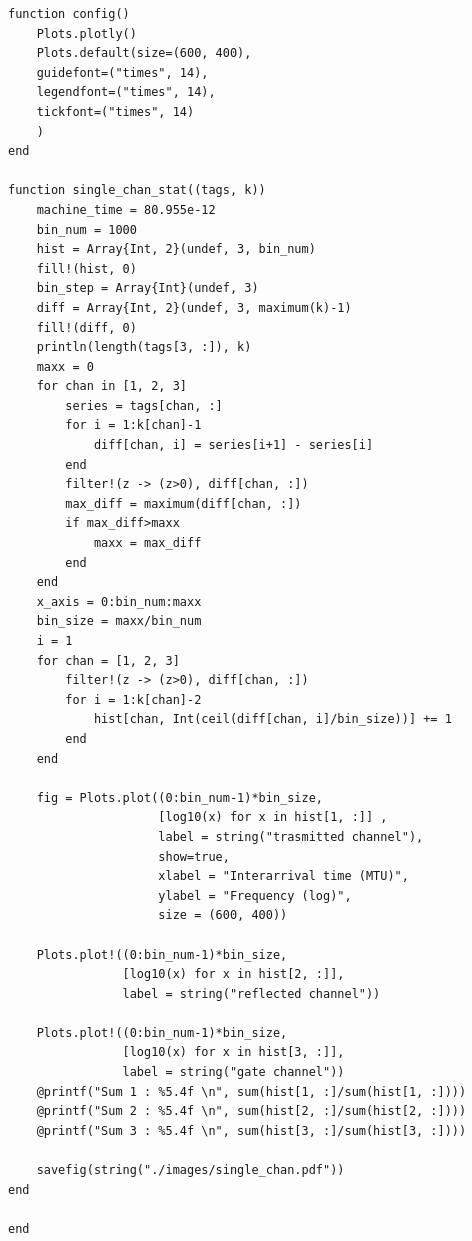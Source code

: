 \documentclass[10pt, final]{article}
\begin{document}
\begin{mdframed}
\begin{lstlisting}
function config()
    Plots.plotly()
    Plots.default(size=(600, 400), 
    guidefont=("times", 14), 
    legendfont=("times", 14),
    tickfont=("times", 14)
    )
end

function single_chan_stat((tags, k))
    machine_time = 80.955e-12
    bin_num = 1000
    hist = Array{Int, 2}(undef, 3, bin_num)
    fill!(hist, 0)
    bin_step = Array{Int}(undef, 3)
    diff = Array{Int, 2}(undef, 3, maximum(k)-1)
    fill!(diff, 0)
    println(length(tags[3, :]), k)
    maxx = 0
    for chan in [1, 2, 3]
        series = tags[chan, :]
        for i = 1:k[chan]-1
            diff[chan, i] = series[i+1] - series[i]
        end
        filter!(z -> (z>0), diff[chan, :])
        max_diff = maximum(diff[chan, :])
        if max_diff>maxx
            maxx = max_diff
        end
    end
    x_axis = 0:bin_num:maxx
    bin_size = maxx/bin_num
    i = 1
    for chan = [1, 2, 3]
        filter!(z -> (z>0), diff[chan, :])
        for i = 1:k[chan]-2
            hist[chan, Int(ceil(diff[chan, i]/bin_size))] += 1
        end
    end

    fig = Plots.plot((0:bin_num-1)*bin_size,
                     [log10(x) for x in hist[1, :]] ,
                     label = string("trasmitted channel"),
                     show=true,
                     xlabel = "Interarrival time (MTU)",
                     ylabel = "Frequency (log)",
                     size = (600, 400))

    Plots.plot!((0:bin_num-1)*bin_size,
                [log10(x) for x in hist[2, :]],
                label = string("reflected channel"))

    Plots.plot!((0:bin_num-1)*bin_size,
                [log10(x) for x in hist[3, :]],
                label = string("gate channel"))
    @printf("Sum 1 : %5.4f \n", sum(hist[1, :]/sum(hist[1, :])))
    @printf("Sum 2 : %5.4f \n", sum(hist[2, :]/sum(hist[2, :])))
    @printf("Sum 3 : %5.4f \n", sum(hist[3, :]/sum(hist[3, :])))

    savefig(string("./images/single_chan.pdf"))
end

end
    \end{lstlisting}
\end{mdframed}
\end{document}
